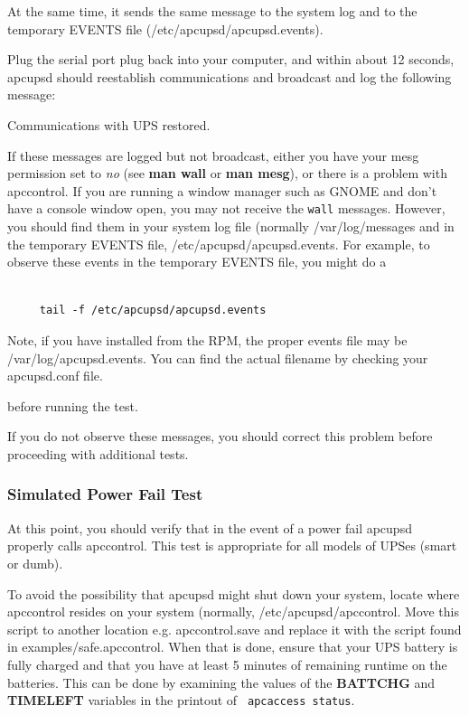 {{At the same time, it sends the same message to the system log and to the
temporary EVENTS file (/etc/apcupsd/apcupsd.events).  

Plug the serial port plug back into your computer, and within about 12
seconds, apcupsd should reestablish communications and broadcast and log the
following message:  

Communications with UPS restored.  

If these messages are logged but not broadcast, either you have your mesg
permission set to {\it no} (see {\bf man wall} or {\bf man mesg}), or there is
a problem with apccontrol. If you are running a window manager such as GNOME
and don't have a console window open, you may not receive the {\tt wall}
messages. However, you should find them in your system log file (normally
/var/log/messages and in the temporary EVENTS file,
/etc/apcupsd/apcupsd.events. For example, to observe these events in the
temporary EVENTS file, you might do a 

\footnotesize
\begin{verbatim}
     
     tail -f /etc/apcupsd/apcupsd.events
\end{verbatim}
\normalsize

Note, if you have installed from the RPM, the proper events file may be
/var/log/apcupsd.events. You can find the actual filename by checking your
apcupsd.conf file.  

before running the test.  

If you do not observe these messages, you should correct this problem before
proceeding with additional tests. 

\label{Simulated-Power-Fail-Test}

\subsubsection*{Simulated Power Fail Test}

\label{index-Testing_002c-Simulate-Power-Fail-93}
\label{index-Simulate-Power-Fail-Test-94}
At this point, you should verify that in the event of a power fail apcupsd
properly calls apccontrol. This test is appropriate for all models of UPSes
(smart or dumb).  

To avoid the possibility that apcupsd might shut down your system, locate
where apccontrol resides on your system (normally, /etc/apcupsd/apccontrol.
Move this script to another location e.g. apccontrol.save and replace it with
the script found in examples/safe.apccontrol. When that is done, ensure that
your UPS battery is fully charged and that you have at least 5 minutes of
remaining runtime on the batteries. This can be done by examining the values
of the {\bf BATTCHG} and {\bf TIMELEFT} variables in the printout of {\tt
apcaccess status}.  

}}
